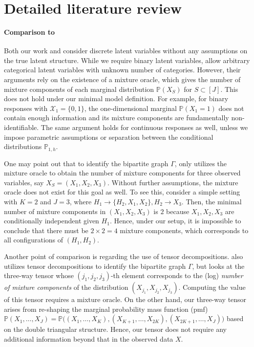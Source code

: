 \documentclass[10pt]{article} %
\newcommand{\PP}{\mathbb P}
\begin{document}
\section{Detailed literature review}\label{sec:literature review}
\paragraph{Comparison to \cite{kivva2021learning}}
Both our work and \cite{kivva2021learning} consider discrete latent variables without any assumptions on the true latent structure.
%
While we require binary latent variables, \cite{kivva2021learning} allow arbitrary categorical latent variables with unknown number of categories. However, their arguments rely on the existence of a mixture oracle, which gives the number of mixture components of each marginal distribution $\PP(X_S)$ for $S \subset [J]$. This does not hold under our minimal model definition. For example, for binary responses with $\mathcal{X}_1=\{0,1\}$, the one-dimensional marginal $\PP(X_1 = 1)$ does not contain enough information and its mixture components are fundamentally non-identifiable. The same argument holds for continuous responses as well, unless we impose parametric assumptions or separation between the conditional distributions $\PP_{1,h}$. %

One may point out that to identify the bipartite graph $\Gamma$, \cite{kivva2021learning} only utilizes the mixture oracle to obtain the number of mixture components for three observed variables, say $X_S = (X_1, X_2, X_3)$. Without further assumptions, the mixture oracle does not exist for this goal as well. To see this, consider a simple setting with $K=2$ and $J=3$, where $H_1 \to \{H_2, X_1, X_2\}, H_2 \to X_3$. Then, the minimal number of mixture components in $(X_1, X_2, X_3)$ is $2$ because $X_1, X_2, X_3$ are conditionally independent given $H_1$. Hence, under our setup, it is impossible to conclude that there must be $2\times 2=4$ mixture components, which corresponds to all configurations of $(H_1, H_2)$.

Another point of comparison is regarding the use of tensor decompositions. \cite{kivva2021learning} also utilizes tensor decompositions to identify the bipartite graph $\Gamma$, but looks at the three-way tensor whose $(j_1, j_2, j_3)$-th element corresponds to the (log) \emph{number of mixture components} of the distribution $(X_{j_1}, X_{j_2}, X_{j_3})$. Computing the value of this tensor requires a mixture oracle. %
On the other hand, our three-way tensor arises from re-shaping the marginal probability mass function (pmf) $\PP(X_1, \ldots, X_J) = \PP\Big((X_1,\ldots, X_K), (X_{K+1}, \ldots, X_{2K}), (X_{2K+1}, \ldots, X_J) \Big)$ based on the double triangular structure. Hence, our tensor does not require any additional information beyond that in the observed data $X$.
\end{document}
